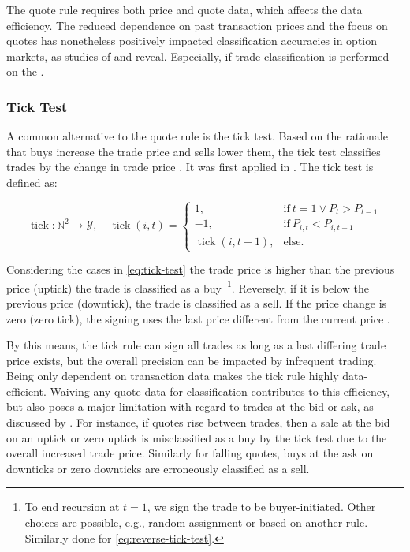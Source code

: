 The quote rule requires both price and quote data, which affects the data efficiency. The reduced dependence on past transaction prices and the focus on quotes has nonetheless positively impacted classification accuracies in option markets, as studies of \textcite[][886]{savickasInferringDirectionOption2003} and \textcite[][3]{grauerOptionTradeClassification2022} reveal. Especially, if trade classification is performed on the .


\subsubsection{Tick Test}\label{sec:tick-test}

A common alternative to the quote rule is the tick test. Based on the rationale that buys increase the trade price and sells lower them, the tick test classifies trades by the change in trade price \autocite[][271]{easleyDiscerningInformationTrade2016}. It was first applied in \textcites[][244]{holthausenEffectLargeBlock1987}[][240]{hasbrouckTradesQuotesInventories1988}. The tick test is defined as:

\begin{equation}
    \operatorname{tick}\colon \mathbb{N}^2 \to \mathcal{Y},\quad
    \operatorname{tick}(i, t)=
    \begin{cases}
        1,                           & \text{if}\ t=1 \lor P_{t}>P_{t-1} \\
        -1,                          & \text{if}\ P_{i, t} < P_{i, t-1}  \\
        \operatorname{tick}(i, t-1), & \text{else}.
    \end{cases}
    \label{eq:tick-test}
\end{equation}

Considering the cases in \cref{eq:tick-test} the trade price is higher than the previous price (uptick) the trade is classified as a buy~\footnote{To end recursion at $t=1$, we sign the trade to be buyer-initiated. Other choices are possible, e.g., random assignment or based on another rule. Similarly done for \cref{eq:reverse-tick-test}.}. Reversely, if it is below the previous price (downtick), the trade is classified as a sell. If the price change is zero (zero tick), the signing uses the last price different from the current price \autocite[][3]{leeInferringTradeDirection1991}.

By this means, the tick rule can sign all trades as long as a last differing trade price exists, but the overall precision can be impacted by infrequent trading. Being only dependent on transaction data makes the tick rule highly data-efficient. Waiving any quote data for classification contributes to this efficiency, but also poses a major limitation with regard to trades at the bid or ask, as discussed by \textcite[][557--558]{finucaneDirectTestMethods2000}. For instance, if quotes rise between trades, then a sale at the bid on an uptick or zero uptick is misclassified as a buy by the tick test due to the overall increased trade price. Similarly for falling quotes, buys at the ask on downticks or zero downticks are erroneously classified as a sell.


